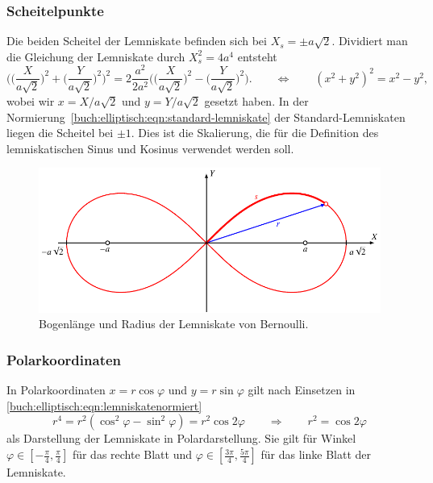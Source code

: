 \subsubsection{Scheitelpunkte}
Die beiden Scheitel der Lemniskate befinden sich bei $X_s=\pm a\!\sqrt{2}$.
Dividiert man die Gleichung der Lemniskate durch $X_s^2=4a^4$ entsteht 
\begin{equation}
\biggl(
\biggl(\frac{X}{a\!\sqrt{2}}\biggr)^2
+
\biggl(\frac{Y}{a\!\sqrt{2}}\biggr)^2
\biggr)^2
=
2\frac{a^2}{2a^2}\biggl(
\biggl(\frac{X}{a\!\sqrt{2}}\biggr)^2
-
\biggl(\frac{Y}{a\!\sqrt{2}}\biggr)^2
\biggr).
\qquad
\Leftrightarrow
\qquad
(x^2+y^2)^2 = x^2-y^2,
\label{buch:elliptisch:eqn:lemniskatenormiert}
\end{equation}
wobei wir $x=X/a\!\sqrt{2}$ und $y=Y/a\!\sqrt{2}$ gesetzt haben.
In der Normierung~\eqref{buch:elliptisch:eqn:standard-lemniskate}
der Standard-Lemniskaten liegen die Scheitel bei $\pm 1$.
Dies ist die Skalierung, die für die Definition des lemniskatischen
Sinus und Kosinus verwendet werden soll.
\begin{figure}
\centering
\includegraphics{chapters/110-elliptisch/images/lemniskate.pdf}
\caption{Bogenlänge und Radius der Lemniskate von Bernoulli.
\label{buch:elliptisch:fig:lemniskate}}
\end{figure}

\subsubsection{Polarkoordinaten}
In Polarkoordinaten $x=r\cos\varphi$ und $y=r\sin\varphi$
gilt nach Einsetzen in \eqref{buch:elliptisch:eqn:lemniskatenormiert}
\begin{equation}
r^4
=
r^2(\cos^2\varphi-\sin^2\varphi)
=
r^2\cos2\varphi
\qquad\Rightarrow\qquad
r^2 = \cos 2\varphi
\label{buch:elliptisch:eqn:lemniskatepolar}
\end{equation}
als Darstellung der Lemniskate in Polardarstellung.
Sie gilt für Winkel $\varphi\in[-\frac{\pi}4,\frac{\pi}4]$ für das
rechte Blatt und $\varphi\in[\frac{3\pi}4,\frac{5\pi}4]$ für das linke
Blatt der Lemniskate.

